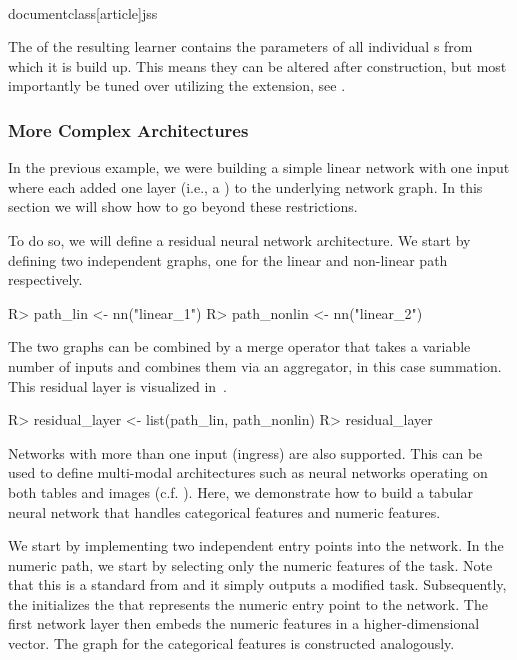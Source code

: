 \\documentclass[article]{jss}
\theoremstyle{definition}
\begin{document}

The  of the resulting learner contains the parameters of all individual s from which it is build up.
This means they can be altered after construction, but most importantly be tuned over utilizing the  extension, see .

\subsubsection{More Complex Architectures}\label{sec:complex-architectures}

In the previous example, we were building a simple linear network with one input where each  added one layer (i.e., a ) to the underlying network graph.
In this section we will show how to go beyond these restrictions.

To do so, we will define a residual neural network architecture.
We start by defining two independent graphs, one for the linear and non-linear path respectively.

\begin{CodeInput}
R> path_lin <- nn("linear_1")
R> path_nonlin <- nn("linear_2") %
\end{CodeInput}

The two graphs can be combined by a merge operator that takes a variable number of inputs and combines them via an aggregator, in this case summation.
This residual layer is visualized in~.

\begin{CodeInput}
R> residual_layer <- list(path_lin, path_nonlin) %
R> residual_layer
\end{CodeInput}


Networks with more than one input (ingress) are also supported.
This can be used to define multi-modal architectures such as neural networks operating on both tables and images (c.f. ).
Here, we demonstrate how to build a tabular neural network that handles categorical features and numeric features.

We start by implementing two independent entry points into the network.
In the numeric path, we start by selecting only the numeric features of the task.
Note that this is a standard  from  and it simply outputs a modified task.
Subsequently, the  initializes the  that represents the numeric entry point to the network.
The first network layer then embeds the numeric features in a higher-dimensional vector.
The graph for the categorical features is constructed analogously.
\end{document}
